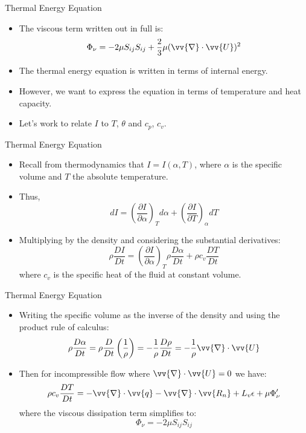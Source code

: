 \begin{frame}{Thermal Energy Equation}

\begin{itemize}
	\item The viscous term written out in full is:
	$$\Phi_\nu = -2\mu S_{ij} S_{ij} + \frac{2}{3}\mu (\vv{\nabla}\cdot \vv{U})^2$$
	\item The thermal energy equation is written in terms of internal energy.
	\item However, we want to express the equation in terms of temperature and heat capacity.
	\item Let's work to relate $I$ to $T$, $\theta$ and $c_{p}$, $c_v$.
\end{itemize}

\end{frame}
\begin{frame}{Thermal Energy Equation}

\begin{itemize}
	\item Recall from thermodynamics that $I=I(\alpha,T)$, where $\alpha$ is the specific volume and $T$ the absolute temperature.
	\item Thus,
	$$dI = \left( \frac{\partial I}{\partial \alpha}\right)_Td\alpha + \left(\frac{\partial I}{\partial T}\right)_\alpha dT$$
	\item Multiplying by the density and considering the substantial derivatives:
	$$\rho\frac{DI}{Dt} = \left(\frac{\partial I}{\partial \alpha}\right)_T\rho\frac{D\alpha}{Dt} + \rho c_v \frac{DT}{Dt}$$
	where $c_v$ is the specific heat of the fluid at constant volume.
\end{itemize}

\end{frame}
\begin{frame}{Thermal Energy Equation}

\begin{itemize}
	\item Writing the specific volume as the inverse of the density and using the product rule of calculus:
	$$\rho \frac{D\alpha}{Dt} = \rho \frac{D}{Dt}\left(\frac{1}{\rho}\right) = -\frac{1}{\rho}\frac{D\rho}{Dt} = -\frac{1}{\rho}\vv{\nabla}\cdot\vv{U}$$
	\item Then for incompressible flow where $\vv{\nabla}\cdot\vv{U}=0$ we have:
	$$\rho c_v \frac{DT}{Dt} = -\vv{\nabla}\cdot \vv{q} -\vv{\nabla}\cdot \vv{R_n} + L_v\epsilon + \mu \Phi^\prime_\nu$$
	where the viscous dissipation term simplifies to:
	$$\Phi_\nu = -2\mu S_{ij}S_{ij}$$
\end{itemize}

\end{frame}
